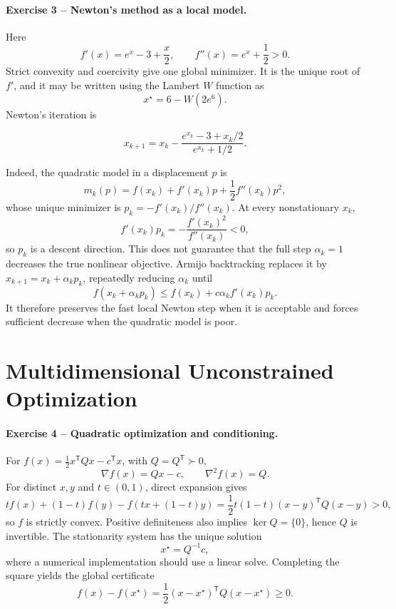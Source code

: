\documentclass[10pt]{article}
\newcommand{\trans}{^{\mathsf T}}
\begin{document}
\paragraph{Exercise 3 -- Newton's method as a local model.}

Here
\[
f'(x)=e^x-3+\frac x2,
\qquad
f''(x)=e^x+\frac12>0.
\]
Strict convexity and coercivity give one global minimizer. It is the unique
root of \(f'\), and it may be written using the Lambert \(W\) function as
\[
x^\star=6-W(2e^6).
\]
Newton's iteration is
\begin{resultbox}
\[
x_{k+1}=x_k-
\frac{e^{x_k}-3+x_k/2}{e^{x_k}+1/2}.
\]
\end{resultbox}
Indeed, the quadratic model in a displacement \(p\) is
\[
m_k(p)=f(x_k)+f'(x_k)p+\frac12f''(x_k)p^2,
\]
whose unique minimizer is \(p_k=-f'(x_k)/f''(x_k)\). At every nonstationary
\(x_k\),
\[
f'(x_k)p_k=-\frac{f'(x_k)^2}{f''(x_k)}<0,
\]
so \(p_k\) is a descent direction. This does not guarantee that the full step
\(\alpha_k=1\) decreases the true nonlinear objective. Armijo backtracking
replaces it by \(x_{k+1}=x_k+\alpha_kp_k\), repeatedly reducing \(\alpha_k\)
until
\[
f(x_k+\alpha_kp_k)
\leq f(x_k)+c\alpha_k f'(x_k)p_k.
\]
It therefore preserves the fast local Newton step when it is acceptable and
forces sufficient decrease when the quadratic model is poor.

\section{Multidimensional Unconstrained Optimization}

\paragraph{Exercise 4 -- Quadratic optimization and conditioning.}

For \(f(x)=\frac12x\trans Qx-c\trans x\), with \(Q=Q\trans\succ0\),
\[
\nabla f(x)=Qx-c,\qquad \nabla^2f(x)=Q.
\]
For distinct \(x,y\) and \(t\in(0,1)\), direct expansion gives
\[
tf(x)+(1-t)f(y)-f(tx+(1-t)y)
=\frac12t(1-t)(x-y)\trans Q(x-y)>0,
\]
so \(f\) is strictly convex. Positive definiteness also implies
\(\ker Q=\{0\}\), hence \(Q\) is invertible. The stationarity system has the
unique solution
\[
\boxed{x^\star=Q^{-1}c},
\]
where a numerical implementation should use a linear solve. Completing the
square yields the global certificate
\[
f(x)-f(x^\star)=\frac12(x-x^\star)\trans Q(x-x^\star)\geq0.
\]
\end{document}
